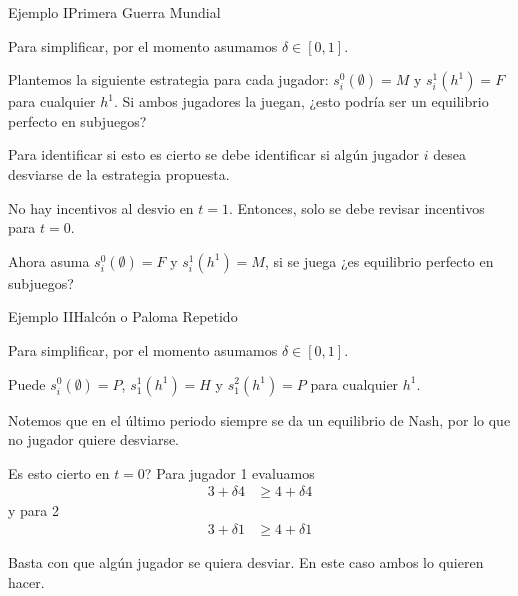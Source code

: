 \documentclass[notes, 11pt]{beamer} %
\newenvironment{wideitemize}{\itemize\addtolength{\itemsep}{10pt}}{\enditemize}
\begin{document}
\begin{frame}{Ejemplo I}{Primera Guerra Mundial}
	\begin{wideitemize}
		\item<1-> Para simplificar, por el momento asumamos $\delta \in [0,1]$. 
		\item<2-> Plantemos la siguiente estrategia para cada jugador: $s_{i}^{0}(\emptyset) = M$ y $s_{i}^{1}(h^{1}) = F$ para cualquier $h^{1}$. Si ambos jugadores la juegan, ¿esto podr\'ia ser un equilibrio perfecto en subjuegos?
		\item<3-> Para identificar si esto es cierto se debe identificar si alg\'un jugador $i$ desea desviarse de la estrategia propuesta.
			\begin{wideitemize}
				\item<4->[--] No hay incentivos al desvio en $t=1$. Entonces, solo se debe revisar incentivos para $t=0$.
			\end{wideitemize}
		\item<5-> Ahora asuma $s_{i}^{0}(\emptyset) = F$ y $s_{i}^{1}(h^{1}) = M$, si se juega ¿es equilibrio perfecto en subjuegos? 
	\end{wideitemize}
\end{frame}

\begin{frame}{Ejemplo II}{Halc\'on o Paloma Repetido}
	\begin{wideitemize}
		\item<1-> Para simplificar, por el momento asumamos $\delta \in [0,1]$. 
		\item<2-> Puede $s_{i}^{0}(\emptyset) = P$, $s_{1}^{1}(h^{1}) = H$ y $s_{1}^{2}(h^{1}) = P$ para cualquier $h^{1}$.			\begin{wideitemize}
				\item<3->[--] Notemos que en el \'ultimo periodo siempre se da un equilibrio de Nash, por lo que no jugador quiere desviarse.
				\item<4->[--] Es esto cierto en $t=0$? Para jugador 1 evaluamos
				\begin{align*}
					3+\delta 4 & \geq 4 + \delta 4 
				\end{align*} y para 2 
				\begin{align*}
					3+\delta 1 & \geq 4 + \delta 1
				\end{align*}
				\item<5->[--] Basta con que alg\'un jugador se quiera desviar. En este caso ambos lo quieren hacer.
			\end{wideitemize}
	\end{wideitemize}
\end{frame}
\end{document}
